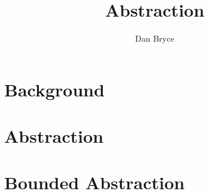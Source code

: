 \documentclass[10pt]{article}
\title{\funman Abstraction}
\author{Dan Bryce}
\newcommand{\region}{\bf X}
\newcommand{\posregion}{{\region}^+}
\newcommand{\negregion}{{\region}^-}
\newcommand{\irrelevantregion}{{\region}^\oslash}
\newcommand{\point}{{\bf x}}
\newcommand{\model}{{\bf M}}
\newcommand{\query}{{\bf Q}}
\newcommand{\reals}{{\mathbb{R}}}
\begin{document}
\maketitle

\section{Background}


\section{Abstraction}


\section{Bounded Abstraction}


% 







\end{document}
